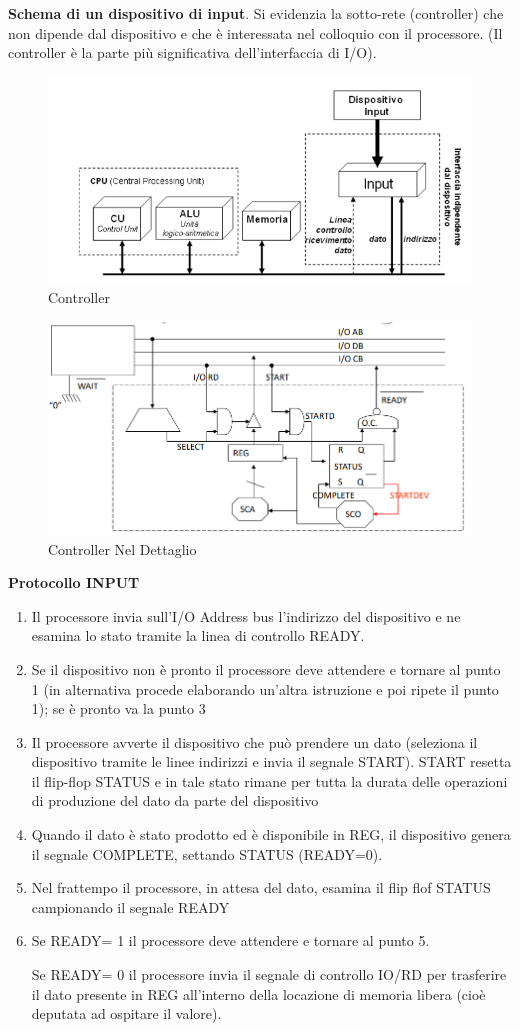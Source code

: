 \documentclass[12pt]{article} %
\begin{document}
\textbf{Schema di un dispositivo di input}. Si evidenzia la sotto-rete (controller) che non
dipende dal dispositivo e che è interessata nel colloquio con il processore. (Il controller è la parte più significativa dell’interfaccia di I/O).
\begin{figure}[h]
    \centering
    \includegraphics[width=0.50\linewidth]{input.png}
    \caption{Controller}
\end{figure}
\begin{figure}[t]
    \centering
    \includegraphics[width=1\linewidth]{controller.png}
    \caption{Controller Nel Dettaglio}
\end{figure}
\newpage
\textbf{Protocollo INPUT}
\begin{enumerate}
    \item  Il processore invia sull’I/O Address bus l’indirizzo del dispositivo e ne esamina lo stato tramite la linea di controllo READY.
    \item Se il dispositivo non è pronto il processore deve attendere e tornare al punto 1 (in alternativa procede elaborando un’altra istruzione e poi ripete il punto 1); se è pronto va la punto 3
    \item Il processore avverte il dispositivo che può prendere un dato (seleziona il dispositivo tramite le linee indirizzi e invia il segnale START). START resetta il flip-flop STATUS e in tale stato rimane per tutta la durata delle operazioni di produzione del dato da parte del dispositivo
    \item Quando il dato è stato prodotto ed è disponibile in REG, il dispositivo genera il segnale COMPLETE, settando STATUS (READY=0).
    \item Nel frattempo il processore, in attesa del dato, esamina il flip flof STATUS campionando il segnale READY
    \item Se READY= 1 il processore deve attendere e tornare al punto 5.
    \par\medskip\noindent Se READY= 0 il processore invia il segnale di controllo IO/RD per trasferire il dato presente in REG all’interno della locazione di memoria libera (cioè deputata ad ospitare il valore).
\end{enumerate}
\end{document}
